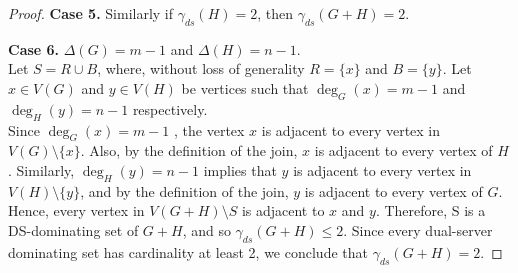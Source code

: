 \documentclass{article}
\begin{document}
\begin{proof}
\textbf{Case 5.} Similarly if $\gamma_{ds}(H)= 2$, then $\gamma_{ds}(G+H)= 2$. 

\textbf{Case 6.} $\Delta(G)=m-1$  and  $\Delta(H)=n-1$.\\ Let $S=R \cup B$, where, without loss of generality $R= \{x\}$ and $B= \{y\}$. Let $x \in V(G)$ and $y \in V(H)$ be vertices such that $\deg_G(x)=m-1$  and   $\deg_H(y)=n-1$ respectively.\\ Since $\deg_G(x)=m-1$ , the vertex $x$ is adjacent to every vertex in $V(G) \setminus \{x\}$. Also, by the definition of the join, $x$ is adjacent to every vertex of $H$. Similarly, $\deg_H(y)=n-1$ implies that $y$ is adjacent to every vertex in  $V(H) \setminus \{y\}$, and by the definition of the join, $y$ is adjacent to every vertex of $G$.\\ Hence, every vertex in $V(G+H)\setminus S$ is adjacent to $x$ and $y$. Therefore, S is a DS-dominating set of $G+H$, and so $\gamma_{ds}(G+H) \leq 2$. Since every dual-server dominating set has cardinality at least 2, we conclude that $\gamma_{ds}(G+H)= 2$.
\end{proof}
\end{document}
